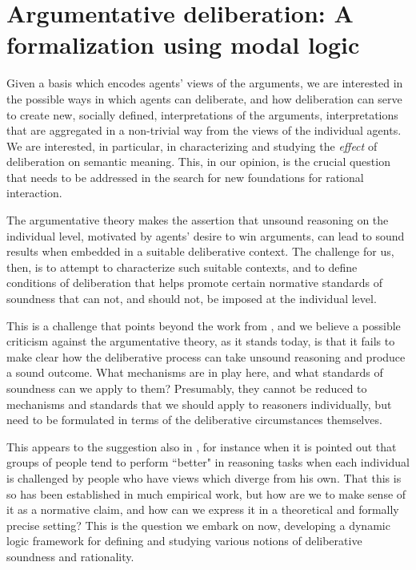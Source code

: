 \documentclass[greybox]{svmult}
\begin{document}
\section{Argumentative deliberation: A formalization using modal logic}\label{sec:ddl}

Given a basis which encodes agents' views of the arguments, we are interested in the possible ways in which agents can deliberate, and how deliberation can serve to create new, socially defined, interpretations of the arguments, interpretations that are aggregated in a non-trivial way from the views of the individual agents.  We are interested, in particular, in characterizing and studying the \emph{effect} of deliberation on semantic meaning. This, in our opinion, is the crucial question that needs to be addressed in the search for new foundations for rational interaction.

The argumentative theory makes the assertion that unsound reasoning on the individual level, motivated by agents' desire to win arguments, can lead to sound results when embedded in a suitable deliberative context. The challenge for us, then, is to attempt to characterize such suitable contexts, and to define conditions of deliberation that helps promote certain normative standards of soundness that can not, and should not, be imposed at the individual level. 

This is a challenge that points beyond the work from \cite{mercier}, and we believe a possible criticism against the argumentative theory, as it stands today, is that it fails to make clear how the deliberative process can take unsound reasoning and produce a sound outcome.  What mechanisms are in play here, and what standards of soundness can we apply to them? Presumably, they cannot be reduced to mechanisms and standards that we should apply to reasoners individually, but need to be formulated in terms of the deliberative circumstances themselves.

This appears to the suggestion also in \cite{mercier}, for instance when it is pointed out that groups of people tend to perform ``better" in reasoning tasks when each individual is challenged by people who have views which diverge from his own. That this is so has been established in much empirical work, but how are we to make sense of it as a normative claim, and how can we express it in a theoretical and formally precise setting? This is the question we embark on now, developing a dynamic logic framework for defining and studying various notions of deliberative soundness and rationality.
\end{document}

